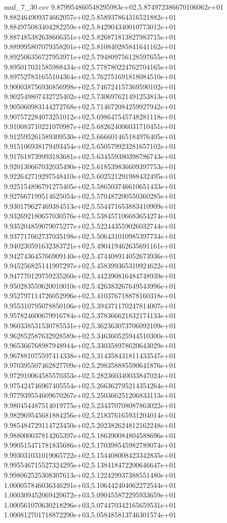\begin{filecontents*}{muf_7_30.csv}
9.879954860548295983e+02,5.874972386670106062e+01
9.882464909374662057e+02,5.858937864316521882e+01
9.884975083404282259e+02,5.842904340010773012e+01
9.887485382638666351e+02,5.826871813827983715e+01
9.889995807079358201e+02,5.810840285841641162e+01
9.892506356727953971e+02,5.794809756128597655e+01
9.895017031585988434e+02,5.778780224762704165e+01
9.897527831655104364e+02,5.762751691818084510e+01
9.900038756936856998e+02,5.746724157369590102e+01
9.902549807432725402e+02,5.730697621491253813e+01
9.905060983144272768e+02,5.714672084259927942e+01
9.907572284073251012e+02,5.698647545748281118e+01
9.910083710221070987e+02,5.682624006031710451e+01
9.912595261589309530e+02,5.666601465184976405e+01
9.915106938179493454e+02,5.650579923281657102e+01
9.917618739993183681e+02,5.634559380398786743e+01
9.920130667032035490e+02,5.618539836609397753e+01
9.922642719297548410e+02,5.602521291988432495e+01
9.925154896791275405e+02,5.586503746610651433e+01
9.927667199514625054e+02,5.570487200550360285e+01
9.930179627469384513e+02,5.554471653883410909e+01
9.932692180657030576e+02,5.538457106683654274e+01
9.935204859079075277e+02,5.522443559026032744e+01
9.937717662737035198e+02,5.506431010985397734e+01
9.940230591632383721e+02,5.490419462635691161e+01
9.942743645766909140e+02,5.474408914052673936e+01
9.945256825141997297e+02,5.458399365310924622e+01
9.947770129759235260e+02,5.442390816484748939e+01
9.950283559620010010e+02,5.426383267649543996e+01
9.952797114726052996e+02,5.410376718878160318e+01
9.955310795078850106e+02,5.394371170247814007e+01
9.957824600679916784e+02,5.378366621832174133e+01
9.960338531530785531e+02,5.362363073706092109e+01
9.962852587632928589e+02,5.346360525944510300e+01
9.965366768987948944e+02,5.330358978620643029e+01
9.967881075597414338e+02,5.314358431811433547e+01
9.970395507462827709e+02,5.298358885590641876e+01
9.972910064585570353e+02,5.282360340033847024e+01
9.975424746967405554e+02,5.266362795214354264e+01
9.977939554609670267e+02,5.250366251206833113e+01
9.980454487514019775e+02,5.234370708087863022e+01
9.982969545681884256e+02,5.218376165931204014e+01
9.985484729114723450e+02,5.202382624812162248e+01
9.988000037814265397e+02,5.186390084804588696e+01
9.990515471781835686e+02,5.170398545982789074e+01
9.993031031019065722e+02,5.154408008423342835e+01
9.995546715527324295e+02,5.138418472200646647e+01
9.998062525308307613e+02,5.122429937388551480e+01
1.000057846036346291e+03,5.106442404062272544e+01
1.000309452069420672e+03,5.090455872295933659e+01
1.000561070630218296e+03,5.074470342165659531e+01
1.000812701718872290e+03,5.058485813746301574e+01

\end{filecontents*}
